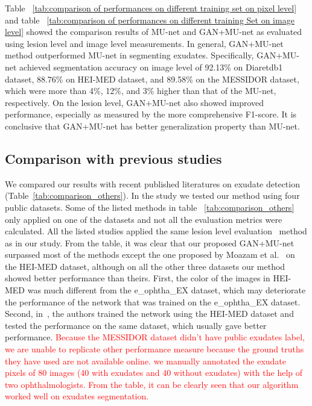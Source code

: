 \documentclass{osa-article}
\begin{document}
Table ~\ref{tab:comparison of performances on different training set on pixel level} and table ~\ref{tab:comparison of performances on different training Set on image level} showed the comparison results of MU-net and GAN+MU-net as evaluated using lesion level and image level measurements. In general, GAN+MU-net method outperformed MU-net in segmenting exudates. Specifically, GAN+MU-net achieved segmentation accuracy on image level of 92.13\% on Diaretdb1 dataset, 88.76\% on HEI-MED dataset, and 89.58\% on the MESSIDOR dataset, which were more than 4\%, 12\%, and 3\% higher than that of the MU-net, respectively. On the lesion level, GAN+MU-net also showed improved performance, especially as measured by the more comprehensive F1-score. It is conclusive that GAN+MU-net has better generalization property than MU-net. 
 

\subsection{Comparison with previous studies}
We compared our results with recent published literatures on exudate detection (Table~\ref{tab:comparison_others}). In the study we tested our method using four public datasets. Some of the listed methods in table ~\ref{tab:comparison_others} only applied on one of the datasets and not all the evaluation metrics were calculated. 
All the listed studies applied the same lesion level evaluation~\cite{wolf2006object} method as in our study. 
From the table, it was clear that our proposed GAN+MU-net surpassed most of the methods except the one proposed by Moazam {et al.}~\cite{fraz2017multiscale} on the HEI-MED dataset, although on all the other three datasets our method showed better performance than theirs. First, the color of the images in HEI-MED was much different from the e\_ophtha\_EX dataset, which may deteriorate the performance of the network that was trained on the e\_ophtha\_EX dataset. Second, in~\cite{fraz2017multiscale}, the authors trained the network using the HEI-MED dataset and tested the performance on the same dataset, which usually gave better performance. \textcolor{red}{Because the MESSIDOR dataset didn't have public exudates label, we are unable to replicate other performance measure because the ground truths they have used are not available online. we manually annotated the exudate pixels of 80 images (40 with exudates and 40 without exudates) with the help of two ophthalmologists. From the table, it can be clearly seen that our algorithm worked well on exudates segmentation.}
                     
\end{document}
